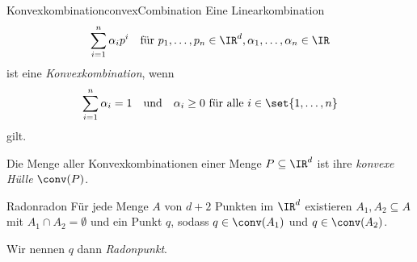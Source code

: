 \documentclass[language=ngerman,algolist,acrolist]{TemplateLecture}
\begin{document}
\begin{defi}{Konvexkombination}{convexCombination}
    Eine Linearkombination 
    \begin{equation*}
        \sum_{i = 1}^n \alpha_i p^i \quad \text{für $p_1, \ldots, p_n \in \IR^d, \alpha_1, \dots, \alpha_n \in \IR$}
    \end{equation*}
    ist eine \emph{Konvexkombination}, wenn 
    \begin{equation*}
        \sum_{i = 1}^n \alpha_i = 1 \quad \text{und} \quad \alpha_i \geq 0 \text{ für alle $i \in \set{1,\ldots, n}$}
    \end{equation*}
    gilt.

    Die Menge aller Konvexkombinationen einer Menge $P \subseteq \IR^d$ ist ihre \emph{konvexe Hülle} $\conv(P)$.
\end{defi}

\begin{lem}{Radon}{radon}
    Für jede Menge $A$ von $d + 2$ Punkten im $\IR^d$ existieren $A_1 , A_2 \subseteq A$ mit $A_1 \cap A_2 = \emptyset$ und ein Punkt $q$, sodass $q \in \conv(A_1)$ und $q \in \conv(A_2)$.
\end{lem}
Wir nennen $q$ dann \emph{Radonpunkt}.
\end{document}
